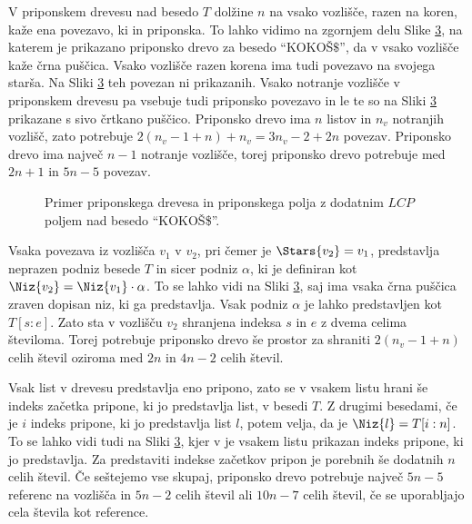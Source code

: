 V priponskem drevesu nad besedo $T$ dolžine $n$ na vsako vozlišče, razen na koren, kaže ena povezavo, ki in priponska. To lahko vidimo na zgornjem delu Slike \ref{fig:SuffuxArray}, na katerem je prikazano priponsko drevo za besedo \enquote{KOKOŠ$\$$}, da v vsako vozlišče kaže črna puščica. Vsako vozlišče razen korena ima tudi povezavo na svojega starša. Na Sliki \ref{fig:SuffuxArray} teh povezan ni prikazanih. Vsako notranje vozlišče v priponskem drevesu pa vsebuje tudi priponsko povezavo in le te so na Sliki \ref{fig:SuffuxArray} prikazane s sivo črtkano puščico. Priponsko drevo ima $n$ listov in $n_v$ notranjih vozlišč, zato potrebuje $2(n_v-1+n)+n_v= 3n_v-2+2n$ povezav. Priponsko drevo ima največ $n-1$ notranje vozlišče, torej priponsko drevo potrebuje med $2n+1$ in $5n -5$ povezav.

\begin{figure}[htb]
    \begin{subfigure}[t]{\linewidth}
        
        
        \centering
        \subcaption*{}
        \label{fig:bSADrevo}
    \end{subfigure}
    \begin{subfigure}[t]{1\linewidth}        
        
        \centering
        \subcaption*{}
        \label{fig:bSAPolje}
    \end{subfigure}
    \caption{Primer priponskega drevesa in priponskega polja z dodatnim $LCP$ poljem nad besedo \enquote{KOKOŠ\$}.} 
    \label{fig:SuffuxArray}
\end{figure}

Vsaka povezava iz vozlišča $v_1$ v $v_2$, pri čemer je $\Stars{v_2}=v_1$, predstavlja neprazen podniz besede $T$ in sicer podniz $\alpha$, ki je definiran kot $\Niz{v_2}=\Niz{v_1}\cdot\alpha$. To se lahko vidi na Sliki \ref{fig:SuffuxArray}, saj ima vsaka črna puščica zraven dopisan niz, ki ga predstavlja. Vsak podniz $\alpha$ je lahko predstavljen kot $T[s:e]$. Zato sta v vozlišču $v_2$ shranjena indeksa $s$ in $e$ z dvema celima številoma. Torej potrebuje priponsko drevo še prostor za shraniti $2(n_v-1+n)$ celih števil oziroma med $2n$ in $4n-2$ celih števil.

Vsak list v drevesu predstavlja eno pripono, zato se v vsakem listu hrani še indeks začetka pripone, ki jo predstavlja list, v besedi $T$. Z drugimi besedami, če je $i$ indeks pripone, ki jo predstavlja list $l$, potem velja, da je $\Niz{l}=T[i:n]$. To se lahko vidi tudi na Sliki \ref{fig:SuffuxArray}, kjer v je vsakem listu prikazan indeks pripone, ki jo predstavlja. Za predstaviti indekse začetkov pripon je porebnih še dodatnih $n$ celih števil. Če seštejemo vse skupaj, priponsko drevo potrebuje največ $5n-5$ referenc na vozlišča in $5n-2$ celih števil ali $10n-7$ celih števil, če se uporabljajo cela števila kot reference.

